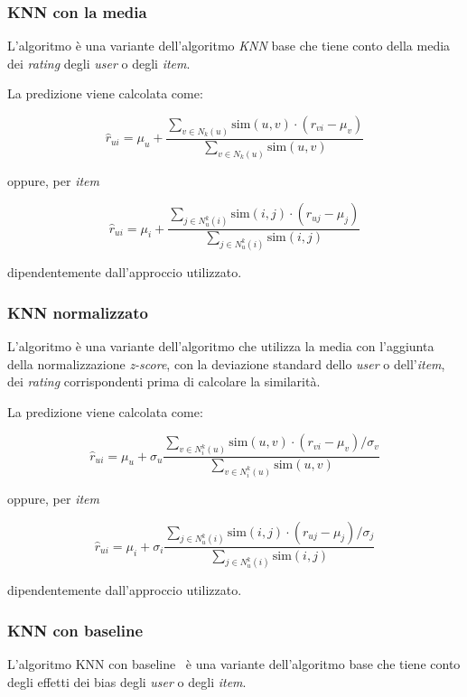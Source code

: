 \subsubsection{KNN con la media}

L'algoritmo è una variante dell'algoritmo \textit{KNN} base che tiene conto della media dei \textit{rating} degli \textit{user} o degli \textit{item}.

La predizione viene calcolata come:

\[
\hat{r}_{ui} = \mu_u + \frac{\sum\limits_{v \in N_k(u)} \text{sim}(u, v) \cdot (r_{vi} - \mu_v)}{\sum\limits_{v \in N_k(u)} \text{sim}(u, v)}
\]

oppure, per \textit{item}

\[
\hat{r}_{ui} = \mu_i + \frac{\sum\limits_{j \in N^k_u(i)} \text{sim}(i, j) \cdot (r_{uj} - \mu_j)}{\sum\limits_{j \in N^k_u(i)} \text{sim}(i, j)}
\]

dipendentemente dall'approccio utilizzato.

\subsubsection{KNN normalizzato}

L'algoritmo è una variante dell'algoritmo che utilizza la media con l'aggiunta della normalizzazione \textit{z-score}, con la deviazione standard dello \textit{user} o dell'\textit{item}, dei \textit{rating} corrispondenti prima di calcolare la similarità.

La predizione viene calcolata come:

\[
\hat{r}_{ui} = \mu_u + \sigma_u \frac{\sum\limits_{v \in N^k_i(u)} \text{sim}(u, v) \cdot (r_{vi} - \mu_v) / \sigma_v}{\sum\limits_{v \in N^k_i(u)} \text{sim}(u, v)}
\]

oppure, per \textit{item}

\[
\hat{r}_{ui} = \mu_i + \sigma_i \frac{\sum\limits_{j \in N^k_u(i)} \text{sim}(i, j) \cdot (r_{uj} - \mu_j) / \sigma_j}{\sum\limits_{j \in N^k_u(i)} \text{sim}(i, j)}
\]

dipendentemente dall'approccio utilizzato.

\subsubsection{KNN con baseline}\label{knn_baseline}

L'algoritmo KNN con baseline~\cite{KNN_baseline} è una variante dell'algoritmo base che tiene conto degli effetti dei bias degli \textit{user} o degli \textit{item}.

